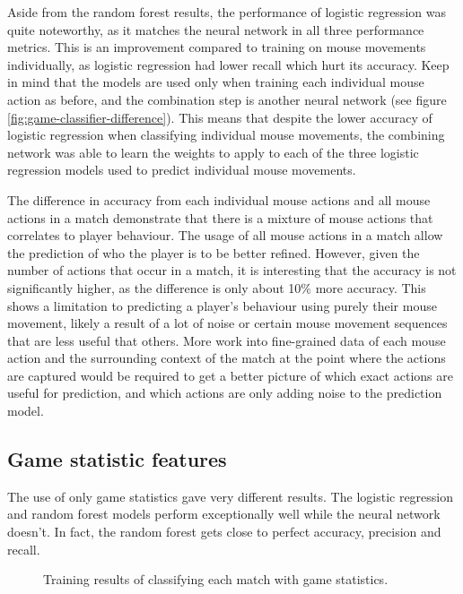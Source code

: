 \documentclass[Report.tex]{subfiles}
\newcommand{\newaxis}[7]{
\begin{axis}[
    ybar,
    title={\textbf{#1}},
    ymin=#3, ymax=#4,
    bar width=1em,
    width={#5},
    height={#6},
    legend style={at={#7},anchor=north,legend columns=-1},
    enlarge x limits=0.4,
    x tick label style={align=center,text width=2cm},
    symbolic x coords={Logistic Regression, Random Forest, Multi-layer Perceptron},
    xtick=data,
    ylabel={#2}
]
}
\newcommand{\plotbar}[3] {
\addplot+[
	discard if not={features}{#1},
] table [x=model, y=#2, col sep=comma] {data/15-game-cv.csv};
\addlegendentry{#3}
}
\begin{document}
Aside from the random forest results, the performance of logistic regression was quite noteworthy, as it matches the neural network in all three performance metrics. This is an improvement compared to training on mouse movements individually, as logistic regression had lower recall which hurt its accuracy. Keep in mind that the models are used only when training each individual mouse action as before, and the combination step is another neural network (see figure \ref{fig:game-classifier-difference}). This means that despite the lower accuracy of logistic regression when classifying individual mouse movements, the combining network was able to learn the weights to apply to each of the three logistic regression models used to predict individual mouse movements. 

The difference in accuracy from each individual mouse actions and all mouse actions in a match demonstrate that there is a mixture of mouse actions that correlates to player behaviour. The usage of all mouse actions in a match allow the prediction of who the player is to be better refined. However, given the number of actions that occur in a match, it is interesting that the accuracy is not significantly higher, as the difference is only about 10\% more accuracy. This shows a limitation to predicting a player's behaviour using purely their mouse movement, likely a result of a lot of noise or certain mouse movement sequences that are less useful that others. More work into fine-grained data of each mouse action and the surrounding context of the match at the point where the actions are captured would be required to get a better picture of which exact actions are useful for prediction, and which actions are only adding noise to the prediction model. 




\subsection{Game statistic features}
The use of only game statistics gave very different results. The logistic regression and random forest models perform exceptionally well while the neural network doesn't. In fact, the random forest gets close to perfect accuracy, precision and recall. 

\begin{figure}[H]
\centering
{}
\caption{Training results of classifying each match with game statistics.}
\end{figure}
\end{document}

